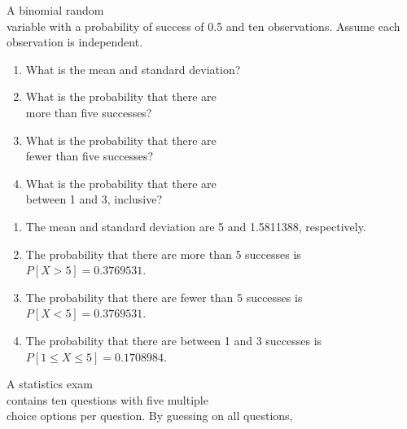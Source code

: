 \documentclass[11pt]{book}\usepackage[]{graphicx}\usepackage[]{color}
\begin{document}
\begin{exercises}
  \begin{exercise} %

A binomial random \\ variable with a probability of success of 0.5 and ten observations. Assume each observation is  independent.

	  \begin{enumerate}
	  \item What is the mean and standard deviation?
    \item What is the probability that there are \\ more than five successes?
    \item What is the probability that there are \\ fewer than five successes?
    \item What is the probability that there are \\ between 1 and 3, inclusive?
	  \end{enumerate}

	\end{exercise}
	\begin{solution}  %


		\begin{enumerate}
	  \item The mean and standard deviation are 5 and 1.5811388, respectively.
    \item The probability that there are more than 5 successes is $P[ X > 5 ] = 0.3769531$.
    \item The probability that there are fewer than 5 successes is $P[ X < 5 ] = 0.3769531$.
    \item The probability that there  are between 1 and 3 successes  is $P[ 1 \le X \le 5 ] = 0.1708984$.
	  \end{enumerate}
	\end{solution}

  \begin{exercise} %



A statistics exam \\ contains ten questions with five multiple \\ choice options per question. By guessing on all questions,


\end{exercise}
\end{exercises}
\end{document}
